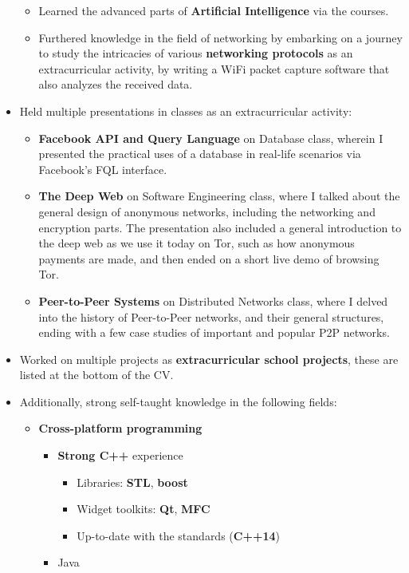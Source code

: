 \documentclass[11pt,a4paper]{article}
\begin{document}
\begin{itemize}
\begin{itemize}
		\item	Learned the advanced parts of \textbf{Artificial Intelligence} via the courses.
		\item	Furthered knowledge in the field of networking by embarking on a journey to study the intricacies of various \textbf{networking protocols} as an extracurricular activity, by writing a WiFi packet capture software that also analyzes the received data.
		\end{itemize}
	\item	Held multiple presentations in classes as an extracurricular activity:
		\begin{itemize}
		\item	\textbf{Facebook API and Query Language} on Database class, wherein I presented the practical uses of a database in real-life scenarios via Facebook's FQL interface.
		\item	\textbf{The Deep Web} on Software Engineering class, where I talked about the general design of anonymous networks, including the networking and encryption parts. The presentation also included a general introduction to the deep web as we use it today on Tor, such as how anonymous payments are made, and then ended on a short live demo of browsing Tor.
		\item	\textbf{Peer-to-Peer Systems} on Distributed Networks class, where I delved into the history of Peer-to-Peer networks, and their general structures, ending with a few case studies of important and popular P2P networks.
		\end{itemize}
	\item	Worked on multiple projects as \textbf{extracurricular school projects}, these are listed at the bottom of the CV.
	\item	Additionally, strong self-taught knowledge in the following fields:
		\begin{itemize}
		\item	\textbf{Cross-platform programming}
			\begin{itemize}
			\item	\textbf{Strong C++} experience
				\begin{itemize}
				\item	Libraries: \textbf{STL}, \textbf{boost}
				\item	Widget toolkits: \textbf{Qt}, \textbf{MFC}
				\item	Up-to-date with the standards (\textbf{C++14})
				\end{itemize}
			\item	Java

\end{itemize}
\end{itemize}
\end{itemize}
\end{document}
